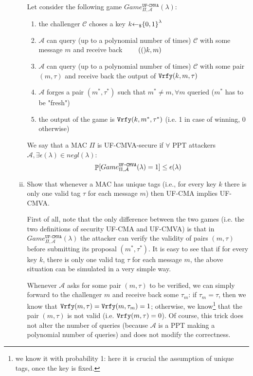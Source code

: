 \begin{enumerate}[(a)]
\begin{enumerate}[(i)]
		            \begin{solution}
			            Let consider the following game $Game_{\Pi, \mathcal{A}}^{\texttt{UF-CMVA}}(\lambda)$:
			            \begin{enumerate}
				            \item the challenger $\mathcal{C}$ choses a key $k \ud \bits^\lambda$
				            \item $\mathcal{A}$ can query (up to a polynomial number of times) $\mathcal{C}$ with some message $m$ and receive back $\tag(k, m)$
				            \item $\mathcal{A}$ can query (up to a polynomial number of times) $\mathcal{C}$ with some pair $(m, \tau)$ and receive back the output of $\vrfy(k, m, \tau)$
				            \item $\mathcal{A}$ forges a pair $(m^*, \tau^*)$ such that $m^* \ne m, \forall m$ queried ($m^*$ has to be "fresh")
				            \item the output of the game is $\vrfy(k, m^*, \tau^*)$ (i.e. 1 in case of winning, 0 otherwise)
			            \end{enumerate}
			            We say that a MAC $\Pi$ is UF-CMVA-secure if $\forall$ PPT attackers $\mathcal{A}, \exists \epsilon(\lambda) \in negl(\lambda)$:
			            \[\P[Game_{\Pi, \mathcal{A}}^{\texttt{UF-CMVA}}(\lambda) = 1] \le \epsilon(\lambda) \]
		            \end{solution}

		      \item Show that whenever a MAC has unique tags (i.e., for every key $k$ there is only one valid tag $\tau$ for each message $m$) then UF-CMA implies UF-CMVA.

		            \begin{solution}
			            First of all, note that the only difference between the two games (i.e. the two definitions of security UF-CMA and UF-CMVA) is that in $Game_{\Pi, \mathcal{A}}^{\texttt{UF-CMVA}}(\lambda)$ the attacker can verify the validity of pairs $(m, \tau)$ before submitting its proposal $(m^*, \tau^*)$.
			            It is easy to see that if for every key $k$, there is only one valid tag $\tau$ for each message $m$, the above situation can be simulated in a very simple way.

			            Whenever $\mathcal{A}$ asks for some pair $(m, \tau)$ to be verified, we can simply forward to the challenger $m$ and receive back some $\tau_m$: if $\tau_m = \tau$, then we know that $\vrfy(m, \tau) = \vrfy(m, \tau_m) = 1$; otherwise, we know\footnote{we know it with probability 1: here it is crucial the assumption of unique tags, once the key is fixed.} that the pair $(m, \tau)$ is not valid (i.e. $\vrfy(m, \tau) = 0$).
			            Of course, this trick does not alter the number of queries (because $\mathcal{A}$ is a PPT making a polynomial number of queries) and does not modify the correctness.
		            \end{solution}


\end{enumerate}
\end{enumerate}
